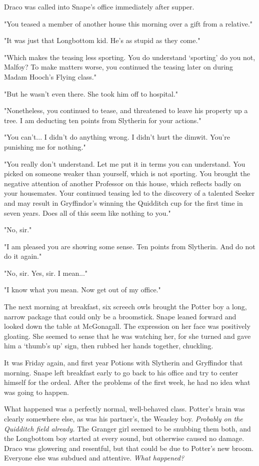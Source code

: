 \documentclass[a4paper,11pt]{article}
\begin{document}
Draco was called into Snape's office immediately after supper.

"You teased a member of another house this morning over a gift from a relative."

"It was just that Longbottom kid. He's as stupid as they come."

"Which makes the teasing less sporting. You do understand `sporting' do you not, Malfoy? To make matters worse, you continued the teasing later on during Madam Hooch's Flying class."

"But he wasn't even there. She took him off to hospital."

"Nonetheless, you continued to tease, and threatened to leave his property up a tree. I am deducting ten points from Slytherin for your actions."

"You can't... I didn't do anything wrong. I didn't hurt the dimwit. You're punishing me for nothing."

"You really don't understand. Let me put it in terms you can understand. You picked on someone weaker than yourself, which is not sporting. You brought the negative attention of another Professor on this house, which reflects badly on your housemates. Your continued teasing led to the discovery of a talented Seeker and may result in Gryffindor's winning the Quidditch cup for the first time in seven years. Does all of this seem like nothing to you."

"No, sir."

"I am pleased you are showing some sense. Ten points from Slytherin. And do not do it again."

"No, sir. Yes, sir. I mean..."

"I know what you mean. Now get out of my office."

The next morning at breakfast, six screech owls brought the Potter boy a long, narrow package that could only be a broomstick. Snape leaned forward and looked down the table at McGonagall. The expression on her face was positively gloating. She seemed to sense that he was watching her, for she turned and gave him a `thumb's up' sign, then rubbed her hands together, chuckling.

It was Friday again, and first year Potions with Slytherin and Gryffindor that morning. Snape left breakfast early to go back to his office and try to center himself for the ordeal. After the problems of the first week, he had no idea what was going to happen.

What happened was a perfectly normal, well-behaved class. Potter's brain was clearly somewhere else, as was his partner's, the Weasley boy. \emph{Probably on the Quidditch field already.} The Granger girl seemed to be snubbing them both, and the Longbottom boy started at every sound, but otherwise caused no damage. Draco was glowering and resentful, but that could be due to Potter's new broom. Everyone else was subdued and attentive. \emph{What happened?}
\end{document}
